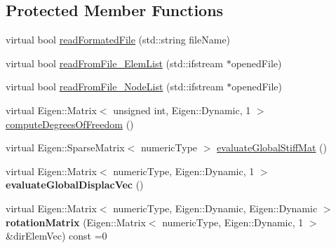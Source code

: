 \subsection*{Protected Member Functions}
\begin{DoxyCompactItemize}
\item 
virtual bool \mbox{\hyperlink{classbase_structural_analysis_class_aa21d6e5d9eea16e4fb57845d93d1ec4b}{read\+Formated\+File}} (std\+::string file\+Name)
\item 
virtual bool \mbox{\hyperlink{classbase_structural_analysis_class_a57fe62169a4032b8c8393d9adb058343}{read\+From\+File\+\_\+\+Elem\+List}} (std\+::ifstream $\ast$opened\+File)
\item 
virtual bool \mbox{\hyperlink{classbase_structural_analysis_class_ad81d20f7c98e21692e68db5019d0e8ae}{read\+From\+File\+\_\+\+Node\+List}} (std\+::ifstream $\ast$opened\+File)
\item 
virtual Eigen\+::\+Matrix$<$ unsigned int, Eigen\+::\+Dynamic, 1 $>$ \mbox{\hyperlink{classbase_structural_analysis_class_aca53b1f1642a1dae799df8f906479f93}{compute\+Degrees\+Of\+Freedom}} ()
\item 
virtual Eigen\+::\+Sparse\+Matrix$<$ numeric\+Type $>$ \mbox{\hyperlink{classbase_structural_analysis_class_a773fa080feae6b17e47e58e5ed810885}{evaluate\+Global\+Stiff\+Mat}} ()
\item 
\mbox{\label{classbase_structural_analysis_class_a8ae8b924f3c1c20f131db1570544cb90}} 
virtual Eigen\+::\+Matrix$<$ numeric\+Type, Eigen\+::\+Dynamic, 1 $>$ {\bfseries evaluate\+Global\+Displac\+Vec} ()
\item 
\mbox{\label{classbase_structural_analysis_class_a110e4cdc86a9e8611dade6db8751f02d}} 
virtual Eigen\+::\+Matrix$<$ numeric\+Type, Eigen\+::\+Dynamic, Eigen\+::\+Dynamic $>$ {\bfseries rotation\+Matrix} (Eigen\+::\+Matrix$<$ numeric\+Type, Eigen\+::\+Dynamic, 1 $>$ \&dir\+Elem\+Vec) const =0
\end{DoxyCompactItemize}
